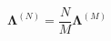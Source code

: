 \documentclass{article}
\begin{document}
	
	
	\begin{equation}
	\boldsymbol{\Lambda}^{(N)} =\frac{N}{M}\boldsymbol{\Lambda}^{(M)}
	\end{equation}
	
\end{document}
